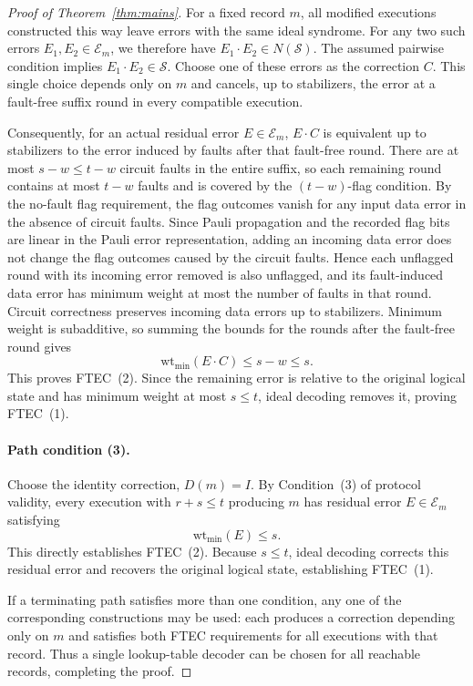 \documentclass[acmsmall,screen,review,anonymous,nonacm]{acmart}
\newcommand{\cS}{\mathcal{S}}
\begin{document}
\begin{proof}[Proof of Theorem~\ref{thm:mains}]
For a fixed record $m$, all modified executions constructed this way
leave errors with the same ideal syndrome. For any two such errors
$E_1,E_2\in\mathcal E_m$, we therefore have
$E_1\cdot E_2\in N(\cS)$. The assumed pairwise condition implies
$E_1\cdot E_2\in\cS$. Choose one of these errors as the correction $C$.
This single choice depends only on $m$ and cancels, up to stabilizers,
the error at a fault-free suffix round in every compatible execution.

Consequently, for an actual residual error $E\in\mathcal E_m$,
$E\cdot C$ is equivalent up to stabilizers to the error induced by
faults after that fault-free round. There are at most $s-w\le t-w$
circuit faults in the entire suffix, so each remaining round contains
at most $t-w$ faults and is covered by the $(t-w)$-flag condition.
By the no-fault
flag requirement, the flag outcomes vanish for any input data error
in the absence of circuit faults. Since Pauli propagation and the
recorded flag bits are linear in the Pauli error representation,
adding an incoming data error does not change the flag outcomes
caused by the circuit faults. Hence each unflagged round with its
incoming error removed is also unflagged, and its fault-induced data
error has minimum weight at most the number of faults in that round.
Circuit correctness preserves incoming data errors up to stabilizers.
Minimum weight is subadditive, so summing the bounds for the rounds
after the fault-free round gives
\[
 \mathrm{wt}_{\min}(E\cdot C)\le s-w\le s.
\]
This proves FTEC~(2). Since the remaining error is relative to the
original logical state and has minimum weight at most $s\le t$,
ideal decoding removes it, proving FTEC~(1).

\paragraph{Path condition (3).}
Choose the identity correction, $D(m)=I$.
By Condition~(3) of protocol validity, every execution with
$r+s\le t$ producing $m$ has residual error $E\in\mathcal E_m$ satisfying
\[
 \mathrm{wt}_{\min}(E)\le s.
\]
This directly establishes FTEC~(2). Because $s\le t$, ideal decoding
corrects this residual error and recovers the original logical state,
establishing FTEC~(1).

If a terminating path satisfies more than one condition, any one of
the corresponding constructions may be used: each produces a
correction depending only on $m$ and satisfies both FTEC requirements
for all executions with that record. Thus a single lookup-table
decoder can be chosen for all reachable records, completing the proof.
\end{proof}
\end{document}
